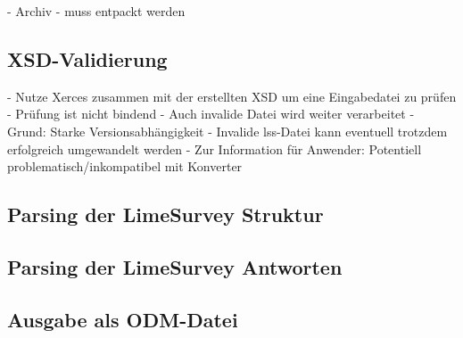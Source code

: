 - Archiv
	- muss entpackt werden

\subsection{XSD-Validierung}

- Nutze Xerces zusammen mit der erstellten XSD um eine Eingabedatei zu prüfen
- Prüfung ist nicht bindend
	- Auch invalide Datei wird weiter verarbeitet
	- Grund: Starke Versionsabhängigkeit
		 - Invalide lss-Datei kann eventuell trotzdem erfolgreich umgewandelt werden
	- Zur Information für Anwender: Potentiell problematisch/inkompatibel mit Konverter

\subsection{Parsing der LimeSurvey Struktur}

\subsection{Parsing der LimeSurvey Antworten}

\subsection{Ausgabe als ODM-Datei}


